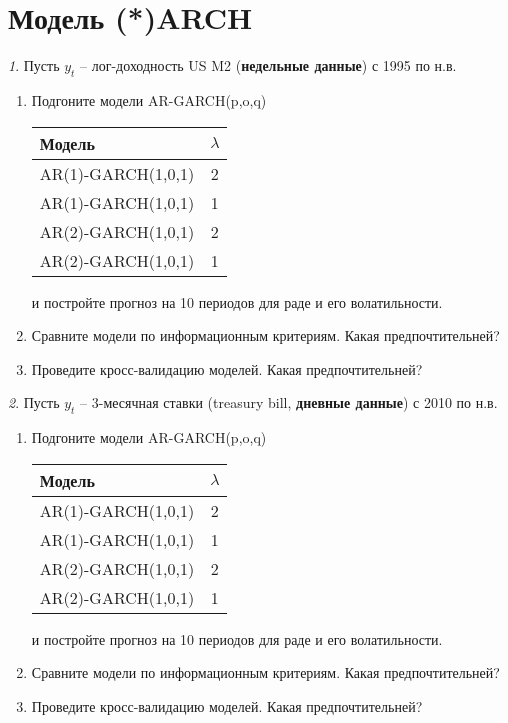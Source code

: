 \documentclass[12pt]{article}
\theoremstyle{remark}
\newtheorem{exercise}{}[subsection]
\begin{document}
\section{Модель (*)ARCH}

\begin{exercise}
Пусть \(y_t\) -- лог-доходность US M2 (\textbf{недельные данные}) с 1995 по н.в.
\begin{enumerate}
	\item Подгоните модели AR-GARCH(p,o,q)
	\begin{center}
	\begin{tabular}{l|c}
		Модель & \(\lambda\) \\ \hline
		AR(1)-GARCH(1,0,1) & 2 \\
		AR(1)-GARCH(1,0,1) & 1 \\
		AR(2)-GARCH(1,0,1) & 2 \\
		AR(2)-GARCH(1,0,1) & 1 \\ \hline
	\end{tabular}
	\end{center} 
	и постройте прогноз на 10 периодов для раде и его волатильности.
	\item Сравните модели по информационным критериям. Какая предпочтительней?
	\item Проведите кросс-валидацию моделей. Какая предпочтительней?
\end{enumerate}
\end{exercise}

\begin{exercise}
Пусть \(y_t\) -- 3-месячная ставки (treasury bill, \textbf{дневные данные}) с 2010 по н.в.
\begin{enumerate}
	\item Подгоните модели AR-GARCH(p,o,q)
	\begin{center}
	\begin{tabular}{l|c}
		Модель & \(\lambda\) \\ \hline
		AR(1)-GARCH(1,0,1) & 2 \\
		AR(1)-GARCH(1,0,1) & 1 \\
		AR(2)-GARCH(1,0,1) & 2 \\
		AR(2)-GARCH(1,0,1) & 1 \\ \hline
	\end{tabular}
	\end{center} 
	и постройте прогноз на 10 периодов для раде и его волатильности.
	\item Сравните модели по информационным критериям. Какая предпочтительней?
	\item Проведите кросс-валидацию моделей. Какая предпочтительней?
\end{enumerate}
\end{exercise}
\end{document}
